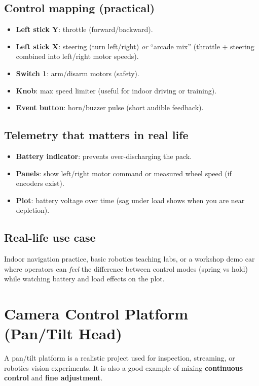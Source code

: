 \subsection*{Control mapping (practical)}
\begin{itemize}
    \item \textbf{Left stick Y}: throttle (forward/backward).
    \item \textbf{Left stick X}: steering (turn left/right) \emph{or} “arcade mix” (throttle + steering combined into left/right motor speeds).
    \item \textbf{Switch 1}: arm/disarm motors (safety).
    \item \textbf{Knob}: max speed limiter (useful for indoor driving or training).
    \item \textbf{Event button}: horn/buzzer pulse (short audible feedback).
\end{itemize}

\subsection*{Telemetry that matters in real life}
\begin{itemize}
    \item \textbf{Battery indicator}: prevents over-discharging the pack.
    \item \textbf{Panels}: show left/right motor command or measured wheel speed (if encoders exist).
    \item \textbf{Plot}: battery voltage over time (sag under load shows when you are near depletion).
\end{itemize}

\subsection*{Real-life use case}
Indoor navigation practice, basic robotics teaching labs, or a workshop demo car where operators can \textit{feel} the difference between control modes (spring vs hold) while watching battery and load effects on the plot.

\section{Camera Control Platform (Pan/Tilt Head)}
\label{sec:example-camera-platform}

A pan/tilt platform is a realistic project used for inspection, streaming, or robotics vision experiments. It is also a good example of mixing \textbf{continuous control} and \textbf{fine adjustment}.


